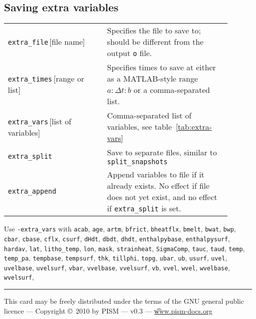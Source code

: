 \documentclass[10pt,landscape]{article}
\begin{document}
\begin{multicols*}{3}
\section{Saving extra variables}

\begin{tabular}{@{}p{0.4\linewidth}p{0.5\linewidth}@{}}
   \texttt{extra_file}\,[file name] & Specifies the file to save to; should be different from the output \texttt{o} file.\\
    \texttt{extra_times}\,[range or list] & Specifies times to save at either as a MATLAB-style range $a:\Delta t:b$ or a comma-separated list.\\
    \texttt{extra_vars}\,[list of variables]& Comma-separated list of variables, see table~\ref{tab:extra-vars}\\
    \texttt{extra_split} & Save to separate files, similar to \texttt{split_snapshots}\\
    \texttt{extra_append} & Append variables to file if it already exists.  No effect if file does not yet exist, and no effect if \texttt{extra_split} is set.
\end{tabular}




Use \verb|-extra_vars| with
    \texttt{acab}, 
    \texttt{age},
    \texttt{artm},
    \texttt{bfrict},
    \texttt{bheatflx},
    \texttt{bmelt},
    \texttt{bwat},
    \texttt{bwp},
    \texttt{cbar},
    \texttt{cbase},
    \texttt{cflx},
    \texttt{csurf},
    \texttt{dHdt},
    \texttt{dbdt},
    \texttt{dhdt},
    \texttt{enthalpybase},
    \texttt{enthalpysurf},
    \texttt{hardav},
    \texttt{lat},
    \texttt{litho_temp},
    \texttt{lon},
    \texttt{mask},
    \texttt{strainheat},
    \texttt{SigmaComp},
    \texttt{tauc},
    \texttt{taud},
    \texttt{temp},
    \texttt{temp_pa},
    \texttt{tempbase},
    \texttt{tempsurf},
    \texttt{thk},
    \texttt{tillphi},
    \texttt{topg},
    \texttt{ubar},
    \texttt{ub},
    \texttt{usurf},
    \texttt{uvel},
    \texttt{uvelbase},
   \texttt{uvelsurf},
    \texttt{vbar},
    \texttt{vvelbase},
    \texttt{vvelsurf},
    \texttt{vb},
    \texttt{vvel},
    \texttt{wvel},
    \texttt{wvelbase},
    \texttt{wvelsurf},



\end{multicols*}

\rule{0.3\linewidth}{0.25pt}
\scriptsize

This card may be freely distributed under the terms of the GNU general
public licence --- Copyright \copyright\ 2010 by PISM --- v0.3 --- \href{http://www.pism-docs.org}{\t{www.pism-docs.org}}
\end{document}
